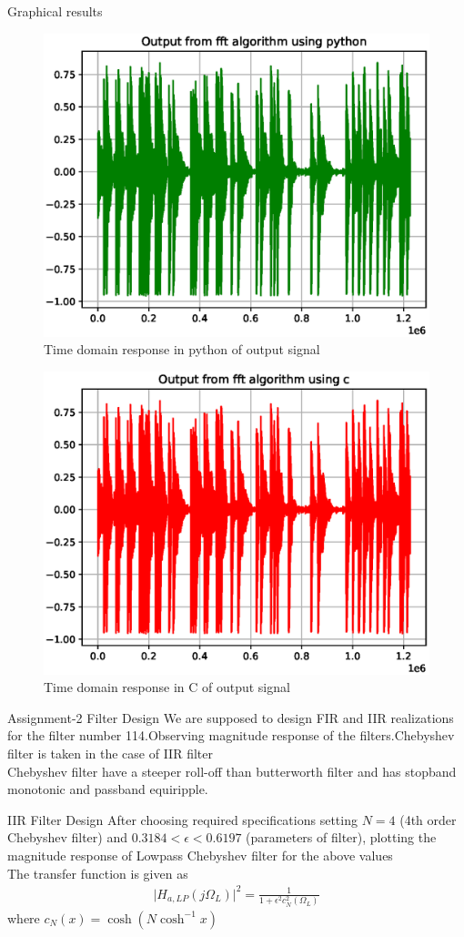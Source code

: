 \documentclass{beamer}
\begin{document}
\begin{frame}{Graphical results}
\begin{figure}[!h]
\includegraphics[width=0.30\columnwidth]{./figs/ee18btech11034_3.eps}
\caption{Time domain response in python of output signal}
\label{fig:Figure3}
\end{figure}

\begin{figure}[!h]
\includegraphics[width=0.30\columnwidth]{./figs/ee18btech11034_4.eps}
\caption{Time domain response in C of output signal}
\label{fig:Figure4}
\end{figure}
\end{frame}
\begin{frame}{Assignment-2 Filter Design}
We are supposed to design FIR and IIR realizations for the filter number 114.Observing magnitude response of the filters.Chebyshev filter is taken in the case of IIR filter
\\
Chebyshev filter have a steeper roll-off than butterworth filter and has stopband monotonic and passband equiripple. 
\end{frame}
\begin{frame}{IIR Filter Design}
After choosing required specifications setting $N=4$ (4th order Chebyshev filter) and $0.3184 < \epsilon < 0.6197$ (parameters of filter), plotting the magnitude response of Lowpass Chebyshev filter for the above values
\\
The transfer function is given as 
\begin{align}
\vert H_{a,LP}(j\Omega_L)\vert^2 = \frac{1}{1 + \epsilon^2c_N^2(\Omega_L)}
\end{align}
where $c_N(x) = \cosh(N \cosh^{-1}x)$ 
\end{frame}
\end{document}
